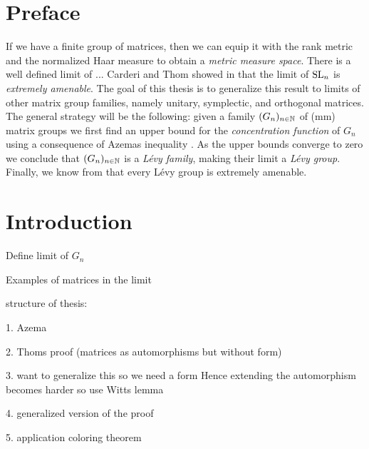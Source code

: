 \section*{Preface}
If we have a finite group of matrices, then we can equip it with the rank metric and the normalized Haar measure to obtain a \emph{metric measure space}.
There is a well defined limit of ...
Carderi and Thom  showed in \cite{thom} that the limit of $\operatorname{SL}_n$ is \emph{extremely amenable}. The goal of this thesis is to generalize this result to limits of other matrix group families, namely unitary, symplectic, and orthogonal matrices. The general strategy will be the following: given a family $(G_n)_{n\in\mathbb{N}}$ of (mm) matrix groups we first find an upper bound for the \emph{concentration function} of $G_n$ using a consequence of Azemas inequality \cite{Azema book}. As the upper bounds converge to zero we conclude that $(G_n)_{n\in\mathbb{N}}$ is a \emph{L\'{e}vy family}, making their limit a \emph{L\'{e}vy group}. Finally, we know from \cite{29} that every L\'{e}vy group is extremely amenable.

\section{Introduction}

Define limit of $G_n$

Examples of matrices in the limit

structure of thesis:

1. Azema

2. Thoms proof (matrices as automorphisms but without form)

3. want to generalize this so we need a form Hence extending the automorphism becomes harder so use Witts lemma

4. generalized version of the proof

5. application coloring theorem


